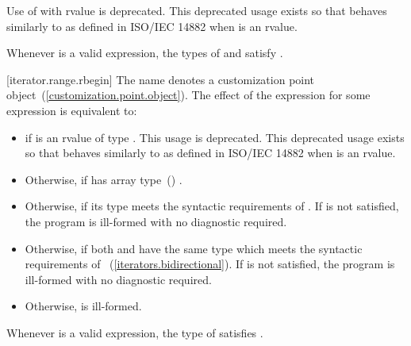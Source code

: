 \begin{addedblock}
\pnum
Use of  with rvalue  is deprecated.
\enternote This deprecated usage exists so that 
behaves similarly to  as defined in ISO/IEC 14882 when
 is an rvalue. \exitnote

\pnum
\enternote Whenever  is a valid expression, the
types of  and  satisfy
. \exitnote

[iterator.range.rbegin]{}
\pnum
The name  denotes a customization point
object~(\ref{customization.point.object}). The effect of the expression
 for some expression  is equivalent
to:

\begin{itemize}
\item
   if  is an rvalue of
  type . This usage is deprecated.
  \enternote This deprecated usage exists so that
   behaves similarly to 
  as defined in ISO/IEC 14882 when  is an rvalue. \exitnote

\item
  Otherwise,  if
   has array type~() .

\item
  Otherwise,  if its type  meets the
  syntactic requirements of . If 
  is not satisfied, the program is ill-formed with no diagnostic
  required.

\item
  Otherwise,  if both
   and  have the same
  type  which meets the syntactic requirements of
  ~(\ref{iterators.bidirectional}).
  If  is not satisfied, the program
  is ill-formed with no diagnostic required.

\item
  Otherwise,  is ill-formed.
\end{itemize}

\pnum
\remark Whenever  is a valid expression, the
type of  satisfies .


\end{addedblock}
